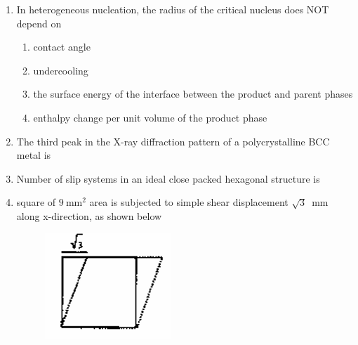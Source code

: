 \documentclass[journal,12pt,onecolumn]{IEEEtran}
\theoremstyle{remark}
\begin{document}
\begin{enumerate}
    \item In heterogeneous nucleation, the radius of the critical nucleus does NOT depend on
    \hfill{}
    \begin{enumerate}[label=(\Alph*)]
        \item contact angle
        \item undercooling
        \item the surface energy of the interface between the product and parent phases
        \item enthalpy change per unit volume of the product phase
    \end{enumerate}

    \item The third peak in the X-ray diffraction pattern of a polycrystalline BCC metal is
    \hfill{}
    \begin{enumerate}[label=(\Alph*)]
    \end{enumerate}

    \item Number of slip systems in an ideal close packed hexagonal structure is
    \hfill{}
    \begin{enumerate}[label=(\Alph*)]
    \end{enumerate}
    \item square of $9~\text{mm}^2$ area is subjected to simple shear displacement $\sqrt{3}$~mm along x-direction, as shown below
    \begin{figure}[H]
    \centering
    \includegraphics[width=0.25\columnwidth]{figs/19.png}
            

\end{figure}
\end{enumerate}
\end{document}

